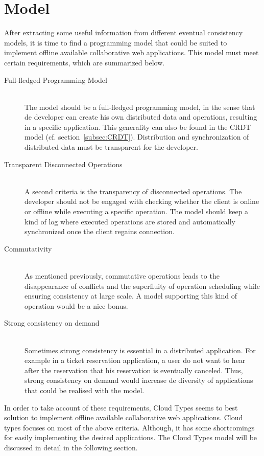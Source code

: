 \documentclass[a4paper,12pt]{report}
\begin{document}
\section{Model}\label{sec:Model}

After extracting some useful information from different eventual consistency models, it is time to find a programming model that could be suited to implement offline available collaborative web applications. This model must meet certain requirements, which are summarized below.

\begin{description}
 \item[Full-fledged Programming Model] \hfill \\The model should be a full-fledged programming model, in the sense that de developer can create his own distributed data and operations, resulting in a specific application. This generality can also be found in the CRDT model (cf. section~\ref{subsec:CRDT}). Distribution and synchronization of distributed data must be transparent for the developer.
 \item[Transparent Disconnected Operations] \hfill \\A second criteria is the transparency of disconnected operations. The developer should not be engaged with checking whether the client is online or offline while executing a specific operation. The model should keep a kind of log where executed operations are stored and automatically synchronized once the client regains connection. 
 \item[Commutativity] \hfill \\As mentioned previously, commutative operations leads to the disappearance of conflicts and the superfluity of operation scheduling while ensuring consistency at large scale. A model supporting this kind of operation would be a nice bonus.  
 \item[Strong consistency on demand] \hfill \\Sometimes strong consistency is essential in a distributed application. For example in a ticket reservation application, a user do not want to hear after the reservation that his reservation is eventually canceled. Thus, strong consistency on demand would increase de diversity of applications that could be realised with the model.
\end{description}

In order to take account of these requirements, Cloud Types seems to best solution to implement offline available collaborative web applications. Cloud types focuses on most of the above criteria. Although, it has some shortcomings for easily implementing the desired applications. The Cloud Types model will be discussed in detail in the following section.
\end{document}
